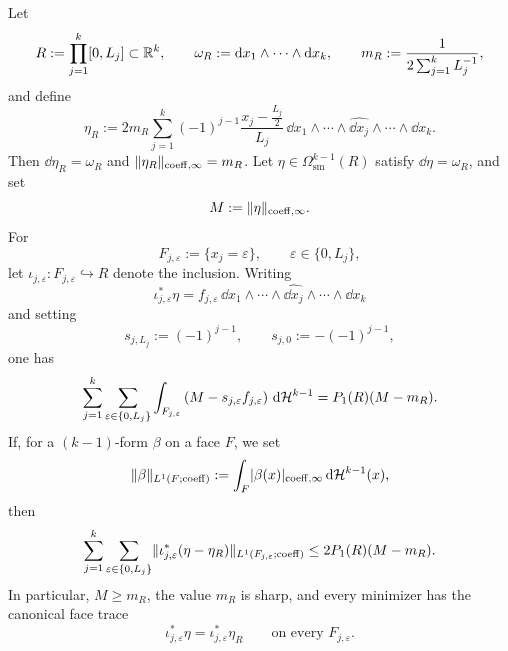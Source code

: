 \begin{theorem}
\label{thm:box-boundary-stability}
Let
\[
R:=\prod_{j=1}^k [0,L_j]\subset\mathbb{R}^k,
\qquad
\omega_R:=\mathrm{d} x_1\wedge\cdots\wedge \mathrm{d} x_k,
\qquad
m_R:=\frac{1}{2\sum_{j=1}^k L_j^{-1}},
\]
and define
\begin{equation}
\label{eq:box-explicit-minimizer}
\eta_R
:=
2m_R\sum_{j=1}^k (-1)^{j-1}
\frac{x_j-\frac{L_j}{2}}{L_j}\,
\dd x_1\wedge\cdots\wedge\widehat{\dd x_j}\wedge\cdots\wedge \dd x_k.
\end{equation}
Then $\dd\eta_R=\omega_R$ and
$\lVert \eta_R \rVert_{\mathrm{coeff},\infty}=m_R$. Let
$\eta\in\Omega^{k-1}_{\mathrm{sm}}(R)$ satisfy $\dd\eta=\omega_R$, and set
\[
M:=\lVert \eta \rVert_{\mathrm{coeff},\infty}.
\]
For
\[
F_{j,\varepsilon}:=\{x_j=\varepsilon\},
\qquad
\varepsilon\in\{0,L_j\},
\]
let $\iota_{j,\varepsilon}:F_{j,\varepsilon}\hookrightarrow R$ denote the
inclusion. Writing
\[
\iota_{j,\varepsilon}^\ast\eta
=
f_{j,\varepsilon}\,
\dd x_1\wedge\cdots\wedge\widehat{\dd x_j}\wedge\cdots\wedge \dd x_k
\]
and setting
\[
s_{j,L_j}:=(-1)^{j-1},
\qquad
s_{j,0}:=-(-1)^{j-1},
\]
one has
\begin{equation}
\label{eq:box-deficit-identity}
\sum_{j=1}^k\sum_{\varepsilon\in\{0,L_j\}}
\int_{F_{j,\varepsilon}}
\left(
M-s_{j,\varepsilon}f_{j,\varepsilon}
\right)\,\mathrm{d}\mathcal{H}^{k-1}
=
P_1(R)(M-m_R).
\end{equation}
If, for a $(k-1)$-form $\beta$ on a face $F$, we set
\[
\lVert \beta \rVert_{L^1(F;\mathrm{coeff})}:=
\int_F \lvert \beta(x) \rvert_{\mathrm{coeff},\infty}\,\mathrm{d}\mathcal{H}^{k-1}(x),
\]
then
\begin{equation}
\label{eq:box-trace-stability}
\sum_{j=1}^k\sum_{\varepsilon\in\{0,L_j\}}
\lVert \iota_{j,\varepsilon}^\ast(\eta-\eta_R) \rVert_{L^1(F_{j,\varepsilon};\mathrm{coeff})}
\le
2P_1(R)(M-m_R).
\end{equation}
In particular, $M\ge m_R$, the value $m_R$ is sharp, and every minimizer has
the canonical face trace
\[
\iota_{j,\varepsilon}^\ast\eta
=
\iota_{j,\varepsilon}^\ast\eta_R
\qquad
\text{on every }F_{j,\varepsilon}.
\]
\end{theorem}

